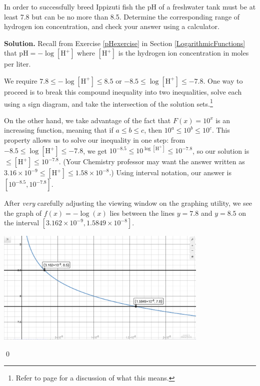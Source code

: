 \documentclass{ximera}
\begin{document}
\begin{ex}

In order to successfully breed Ippizuti fish the pH of a freshwater tank must be at least 7.8 but can be no more than 8.5.  Determine the corresponding range of hydrogen ion concentration, and check your answer using a calculator.

\smallskip

{\bf Solution.}  Recall from Exercise \ref{pHexercise} in Section \ref{LogarithmicFunctions} that $\text{pH} = -\log[\text{H}^{+}]$ where $[\text{H}^{+}]$ is the hydrogen ion concentration in moles per liter.  

\smallskip

We require $7.8 \leq -\log[\text{H}^{+}] \leq 8.5$ or $-8.5 \leq   \log[\text{H}^{+}] \leq -7.8$.  One way to proceed is to break this compound inequality into two inequalities, solve each using a sign diagram, and take the intersection of the solution sets.\footnote{Refer to page \pageref{intersectionunion} for a discussion of what this means.}  

\smallskip

On the other hand, we take advantage of the fact that $F(x) = 10^{x}$ is an increasing function, meaning that if $a \leq b \leq c$, then $10^{a} \leq 10^{b} \leq 10^{c}$.  This property allows us to solve our inequality in one step: from $-8.5 \leq   \log[\text{H}^{+}] \leq -7.8$, we get   $10^{-8.5} \leq   10^{\log[\text{H}^{+}]} \leq 10^{-7.8}$, so our solution is $ \leq   [\text{H}^{+}] \leq 10^{-7.8}$.  (Your Chemistry professor may want the answer written as $3.16 \times 10^{-9} \leq [\text{H}^{+}] \leq 1.58 \times 10^{-8}$.)  Using interval notation, our answer is $\left[10^{-8.5}, 10^{-7.8}\right]$.   

\smallskip

After \textit{very} carefully adjusting the viewing window on the graphing utility, we see the graph of $f(x) = -\log(x)$ lies between the lines $y = 7.8$ and $y = 8.5$ on the interval $[3.162 \times 10^{-9}, 1.5849 \times 10^{-8}]$.

\smallskip

\begin{center}

\includegraphics[width=4in]{./LogarithmicEquationsandInequalitiesGraphics/LogEqnEx10.jpg}

\end{center}

\qed

\end{ex}
\end{document}

